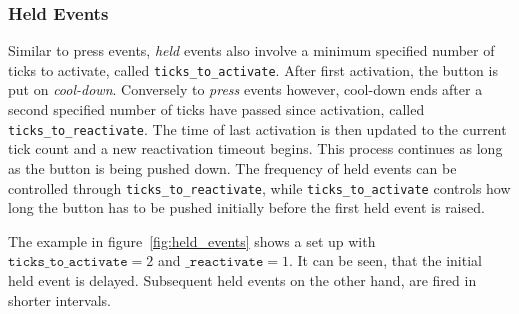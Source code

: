 \subsubsection{Held Events}\label{sec:held_events}

Similar to press events, \emph{held} events also involve a minimum specified number of ticks to activate, called \texttt{ticks\_to\_activate}. After first activation, the button is put on \emph{cool-down}. Conversely to \emph{press} events however, cool-down ends after a second specified number of ticks have passed since activation, called \texttt{ticks\_to\_reactivate}. The time of last activation is then updated to the current tick count and a new reactivation timeout begins. This process continues as long as the button is being pushed down. The frequency of held events can be controlled through \texttt{ticks\_to\_reactivate}, while \texttt{ticks\_to\_activate} controls how long the button has to be pushed initially before the first held event is raised.

The example in figure~\ref{fig:held_events} shows a set up with \(\texttt{ticks\_to\_activate} = 2\) and \(\texttt{\_reactivate} = 1\). It can be seen, that the initial held event is delayed. Subsequent held events on the other hand, are fired in shorter intervals.

